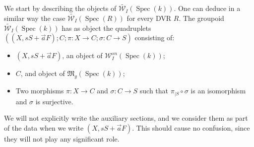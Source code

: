 \documentclass[11pt]{amsart}
\newcommand{\cE}{\mathcal{W}}
\newcommand{\spec}{\operatorname{Spec}}
\theoremstyle{definition}
\begin{document}
We start by describing the objects of $\widetilde{\cE_I}(\spec(k))$. One can deduce in a similar way the case
$\widetilde{\cE_I}(\spec(R))$ for every DVR $R$.
The groupoid $\widetilde{\cE_I}(\spec(k))$ has as object the quadruplets $((X,sS+\vec{a}F); C; \pi:X\to C; \sigma:C \to S)$
consisting of:
\begin{itemize}
 \item $(X,sS+\vec{a}F)$, an object of $\cE_I^{sn}(\spec(k))$;
 \item $C$, and object of $\mathfrak{M}_g(\spec(k))$;
 \item Two morphisms $\pi:X \to C$ and $\sigma:C \to S$ such that $\pi_{|S}\circ \sigma$ is an isomorphism and $\sigma$ is surjective.
\end{itemize}
We will not explicitly write the auxiliary sections, and we consider them as part of the data when we write $(X,sS+\vec{a}F)$. This should cause no confusion, since they will not play any significant role.
\end{document}

